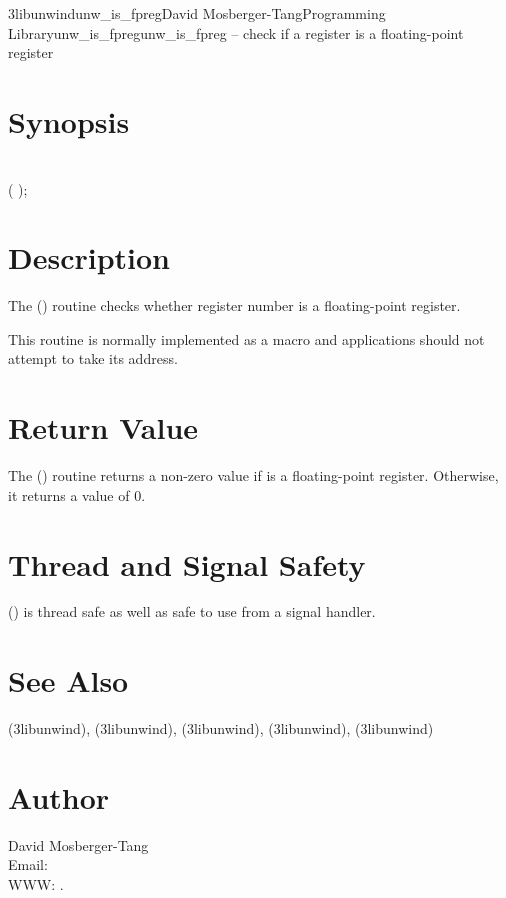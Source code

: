 \documentclass{article}
\begin{document}
\begin{Name}{3libunwind}{unw\_is\_fpreg}{David Mosberger-Tang}{Programming Library}{unw\_is\_fpreg}unw\_is\_fpreg -- check if a register is a floating-point register
\end{Name}

\section{Synopsis}

\\

 ( );\\

\section{Description}

The () routine checks whether register number
 is a floating-point register.

This routine is normally implemented as a macro and applications
should not attempt to take its address.

\section{Return Value}

The () routine returns a non-zero value if
 is a floating-point register.  Otherwise, it returns a value
of 0.

\section{Thread and Signal Safety}

() is thread safe as well as safe to use
from a signal handler.

\section{See Also}

(3libunwind),
(3libunwind),
(3libunwind),
(3libunwind),
(3libunwind)

\section{Author}

\noindent
David Mosberger-Tang\\
Email: \\
WWW: .
\LatexManEnd
\end{document}
